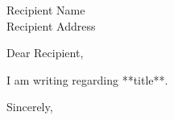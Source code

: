 \documentclass[11pt]{letter}
\date{**date**}
\begin{document}
\begin{letter}{Recipient Name\\Recipient Address}
\opening{Dear Recipient,}

I am writing regarding **title**.

\closing{Sincerely,}
\end{letter}
\end{document}
